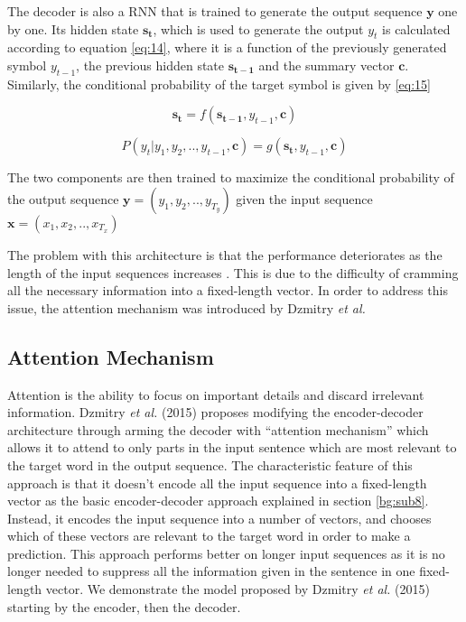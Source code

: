 The decoder is also a \ac{RNN} that is trained to generate the output sequence $ \mathbf{y}$ one by one. 
Its hidden state $ \mathbf{s_t}$, which is used to generate the output  $ y_t$ is calculated according to equation \ref{eq:14}, where it is a function of the previously generated symbol $y_{t-1}$, the previous hidden state $\mathbf{s_{t-1}}$ and the summary vector $\mathbf{c}$. Similarly, the conditional probability of the target symbol is given by \ref{eq:15}

\begin{equation}
\label{eq:14}
\mathbf{s_t} = f(\mathbf{s_{t-1}}, y_{t-1}, \mathbf{c})
\end{equation}

\begin{equation}
\label{eq:15}
P(y_t | y_1, y_2,.., y_{t-1}, \mathbf{c}) = g(\mathbf{s_{t}}, y_{t-1}, \mathbf{c})
\end{equation}

The two components are then trained to maximize the conditional probability of the output sequence $\mathbf{y}=(y_1,y_2,..,y_{T_y})$ given the input sequence $ \mathbf{x}=(x_1,x_2,..,x_{T_x})$


The problem with this architecture is that the performance deteriorates as the length of the input sequences increases \cite{cho2014properties}. This is due to the difficulty of cramming all the necessary information into a fixed-length vector. In order to address this issue, the attention mechanism was introduced by Dzmitry \textit{et al.} \cite{bahdanau2014neural}


\subsection{Attention Mechanism} 
\label{bg:sub10}

Attention is the ability to focus on important details and discard irrelevant information. Dzmitry \textit{et al.} (2015) \cite{bahdanau2014neural} proposes modifying the encoder-decoder architecture through arming the decoder with \enquote{attention mechanism} which allows it to attend to only parts in the input sentence which are most relevant to the target word in the output sequence. The characteristic feature of this approach is that it doesn't encode all the input sequence into a fixed-length vector as the basic encoder-decoder approach explained in section \ref{bg:sub8}. Instead, it encodes the input sequence into a number of vectors, and chooses which of these vectors are relevant to the target word in order to make a prediction. This approach performs better on longer input sequences as it is no longer needed to suppress all the information given in the sentence in one fixed-length vector. We demonstrate the model proposed by Dzmitry \textit{et al.} (2015) \cite{bahdanau2014neural} starting by the encoder, then the decoder.

